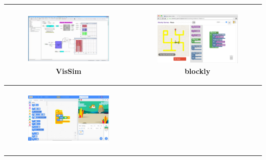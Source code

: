             \begin{table}[!h]
            \centering
            \begin{tabular}{|c|c|}
            \hline
               \begin{subfigure}{0.35\linewidth}\centering
               \includegraphics[width=0.9\linewidth]{Figures/lang-vissim}
               \caption{\label{tab:VisSim}VisSim}
               \strut
               \end{subfigure}
                &
               \begin{subfigure}{0.35\linewidth}\centering
               \includegraphics[width=0.9\linewidth]{Figures/lang-blockly}
               \caption{\label{tab:Blockly}blockly}
               \strut
               \end{subfigure}
                \\ \hline
               \begin{subfigure}{0.35\linewidth}\centering
               \includegraphics[width=0.9\linewidth]{Figures/lang-Scratch}

\end{subfigure}
\end{tabular}
\end{table}
